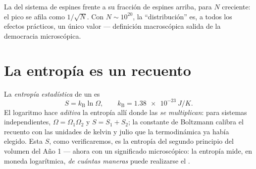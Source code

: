\begin{omfigure}

{\small La  del sistema de espines frente a su fracción de
espines arriba, para $N$ creciente: el pico se afila como $1/\sqrt N$. Con $N \sim
10^{20}$, la ``distribución'' es, a todos los efectos prácticos, un
único valor --- definición macroscópica salida de la democracia
microscópica.}
\end{omfigure}

\section{La entropía es un recuento}

\begin{definition}\label{def:b3:microcanonical-ensemble:entropy}
La \emph{entropía estadística} de un  es
\[
S = k_{\text{B}}\ln\Omega , \qquad
k_{\text{B}} = \qty{1.38e-23}{J/K} .
\]
El logaritmo hace \emph{aditiva} la entropía allí donde las 
\emph{se multiplican}: para sistemas independientes, $\Omega = \Omega_1\Omega_2$
y $S = S_1 + S_2$; la constante de Boltzmann calibra el recuento con las
unidades de kelvin y julio que la termodinámica ya había elegido. Esta
$S$, como verificaremos, es la entropía del segundo principio del volumen
del Año 1 --- ahora con un significado microscópico: la entropía mide, en
moneda logarítmica, \emph{de cuántas maneras} puede realizarse el
.
\end{definition}

